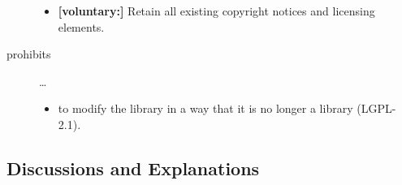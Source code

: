 \begin{description}
\begin{itemize}
  \item \textbf{[voluntary:]} Retain all existing copyright notices and
  licensing elements. 
  
\end{itemize}

\item[prohibits] \ldots
\begin{itemize}
  \item to modify the library in a way that it is no longer a library
  (LGPL-2.1).
\end{itemize}

\end{description}

\subsection{Discussions and Explanations}

